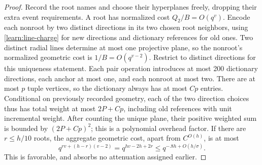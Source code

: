 \begin{proof}
Record the root names and choose their hyperplanes freely, dropping
their extra event requirements. A root has normalized cost
$Q_2/B=O(q^v)$. Encode each nonroot by two distinct directions in
its two chosen root neighbors, using \eqref{learn:line-charge} for
new directions and dictionary references for old ones. Two distinct
radial lines determine at most one projective plane, so the nonroot's
normalized geometric cost is $1/B=O(q^{v-2})$. Restrict to distinct
directions for this uniqueness statement. Each pair operation introduces
at most 200 dictionary directions, each anchor at most one, and each
nonroot at most two. There are at most $p$ tuple vertices, so the
dictionary always has at most $Cp$ entries. Conditional on previously
recorded geometry, each of the two direction choices thus has total
weight at most $2P+Cp$, including old references with unit incremental
weight. After counting the unique plane, their positive weighted sum is
bounded by $(2P+Cp)^2$; this is a polynomial overhead factor.
If there are $r\le h/10$ roots, the aggregate
geometric cost, apart from $C^{O(h)}$, is at most
\begin{equation}\label{learn:root-saving}
 q^{rv+(h-r)(v-2)}
 =q^{hv-2h+2r}\le q^{-.8h+O(h/\sigma)}.
\end{equation}
This is favorable, and absorbs no attenuation assigned earlier.


\end{proof}
